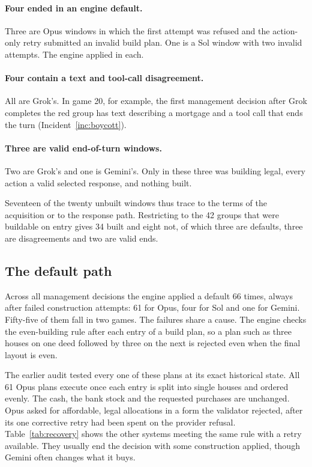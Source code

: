 \paragraph{Four ended in an engine default.} Three are Opus windows in which the first attempt was refused and the action-only retry submitted an invalid build plan. One is a Sol window with two invalid attempts. The engine applied \End{} in each.

\paragraph{Four contain a text and tool-call disagreement.} All are Grok's. In game 20, for example, the first management decision after Grok completes the red group has text describing a mortgage and a tool call that ends the turn (Incident~\ref{inc:boycott}).

\paragraph{Three are valid end-of-turn windows.} Two are Grok's and one is Gemini's. Only in these three was building legal, every action a valid selected response, and nothing built.

Seventeen of the twenty unbuilt windows thus trace to the terms of the acquisition or to the response path. Restricting to the 42 groups that were buildable on entry gives 34 built and eight not, of which three are defaults, three are disagreements and two are valid ends.

\subsection{The default path}
\label{sec:defaults}

Across all management decisions the engine applied a default \End{} 66 times, always after failed construction attempts: 61 for Opus, four for Sol and one for Gemini. Fifty-five of them fall in two games. The failures share a cause. The engine checks the even-building rule after each entry of a build plan, so a plan such as three houses on one deed followed by three on the next is rejected even when the final layout is even.

The earlier audit tested every one of these plans at its exact historical state. All 61 Opus plans execute once each entry is split into single houses and ordered evenly. The cash, the bank stock and the requested purchases are unchanged. Opus asked for affordable, legal allocations in a form the validator rejected, after its one corrective retry had been spent on the provider refusal. Table~\ref{tab:recovery} shows the other systems meeting the same rule with a retry available. They usually end the decision with some construction applied, though Gemini often changes what it buys.

